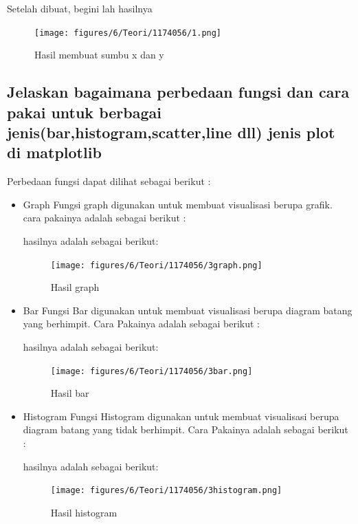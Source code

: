Setelah dibuat, begini lah hasilnya
\begin{figure}[H]
	\texttt{[image: figures/6/Teori/1174056/1.png]}
	\caption{Hasil membuat sumbu x dan y}
	\centering
\end{figure}

\subsection{Jelaskan bagaimana perbedaan fungsi dan cara pakai untuk berbagai jenis(bar,histogram,scatter,line dll) jenis plot di matplotlib}
Perbedaan fungsi dapat dilihat sebagai berikut :
\begin{itemize}
    \item Graph\linebreak
    Fungsi graph digunakan untuk membuat visualisasi berupa grafik.
    cara pakainya adalah sebagai berikut :
    
    hasilnya adalah sebagai berikut:
    \begin{figure}[H]
        \texttt{[image: figures/6/Teori/1174056/3graph.png]}
        \caption{Hasil graph}
        \centering
    \end{figure}

    \item Bar\linebreak 
    Fungsi Bar digunakan untuk membuat visualisasi berupa diagram batang yang berhimpit.
    Cara Pakainya adalah sebagai berikut :
    
    hasilnya adalah sebagai berikut:
    \begin{figure}[H]
        \texttt{[image: figures/6/Teori/1174056/3bar.png]}
        \caption{Hasil bar}
        \centering
    \end{figure}

    \item Histogram\linebreak
    Fungsi Histogram digunakan untuk membuat visualisasi berupa diagram batang yang tidak berhimpit.
    Cara Pakainya adalah sebagai berikut :
    
    hasilnya adalah sebagai berikut:
    \begin{figure}[H]
        \texttt{[image: figures/6/Teori/1174056/3histogram.png]}
        \caption{Hasil histogram}
        \centering
    \end{figure}


\end{itemize}
